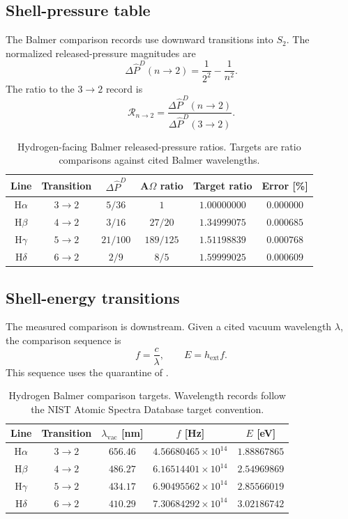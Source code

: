\subsection{Shell-pressure table}\label{manual:hydrogen:pressure-table}
The Balmer comparison records use downward transitions into \(S_2\). The normalized released-pressure magnitudes are
\[
\Delta \widehat P^D(n\to2)=\frac{1}{2^2}-\frac{1}{n^2}.
\]
The ratio to the \(3\to2\) record is
\[
\mathcal R_{n\to2}
=
\frac{\Delta \widehat P^D(n\to2)}{\Delta \widehat P^D(3\to2)}.
\]

\begin{table}[h]
\centering
\scriptsize
\caption{Hydrogen-facing Balmer released-pressure ratios. Targets are ratio comparisons against cited Balmer wavelengths.}
\begin{tabular}{c c c c c c}
\toprule
Line & Transition & $\Delta\widehat P^D$ & A\(\Omega\) ratio & Target ratio & Error [\%]\\
\midrule
H$\alpha$ & $3\to2$ & $5/36$ & $1$ & $1.00000000$ & $0.000000$\\
H$\beta$ & $4\to2$ & $3/16$ & $27/20$ & $1.34999075$ & $0.000685$\\
H$\gamma$ & $5\to2$ & $21/100$ & $189/125$ & $1.51198839$ & $0.000768$\\
H$\delta$ & $6\to2$ & $2/9$ & $8/5$ & $1.59999025$ & $0.000609$\\
\bottomrule
\end{tabular}
\label{tab:manual-hydrogen-pressure-ratios}
\end{table}

\subsection{Shell-energy transitions}\label{manual:hydrogen:energy-transitions}
The measured comparison is downstream. Given a cited vacuum wavelength \(\lambda\), the comparison sequence is
\[
f=\frac{c}{\lambda},
\qquad
E=h_{\mathrm{ext}}f.
\]
This sequence uses the quarantine of .

\begin{table}[h]
\centering
\scriptsize
\caption{Hydrogen Balmer comparison targets. Wavelength records follow the NIST Atomic Spectra Database target convention.}
\begin{tabular}{c c c c c}
\toprule
Line & Transition & $\lambda_{\mathrm{vac}}$ [nm] & $f$ [Hz] & $E$ [eV]\\
\midrule
H$\alpha$ & $3\to2$ & $656.46$ & $4.56680465\times10^{14}$ & $1.88867865$\\
H$\beta$ & $4\to2$ & $486.27$ & $6.16514401\times10^{14}$ & $2.54969869$\\
H$\gamma$ & $5\to2$ & $434.17$ & $6.90495562\times10^{14}$ & $2.85566019$\\
H$\delta$ & $6\to2$ & $410.29$ & $7.30684292\times10^{14}$ & $3.02186742$\\
\bottomrule
\end{tabular}
\label{tab:manual-hydrogen-balmer-targets}
\end{table}



